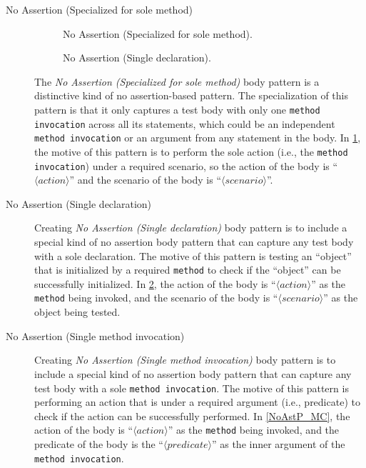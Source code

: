 \documentclass[proposal.tex]{subfiles}
\begin{document}
\begin{description}
\item[No Assertion (Specialized for sole method)]

\begin{figure}[t]
\centering
    \begin{subfigure}{0.6\textwidth}
    \end{subfigure}
\caption{No Assertion (Specialized for sole method).}
\label{NoAstP_one}
\end{figure}

\begin{figure}[t]
\centering
    \begin{subfigure}{0.7\textwidth}
    \end{subfigure}
\caption{No Assertion (Single declaration).}
\label{NoAstP_SD}
\end{figure}


The \textit{No Assertion (Specialized for sole method)} body pattern is a distinctive kind of no assertion-based pattern.
%
The specialization of this pattern is that it only captures a test body with only one \texttt{method invocation} across all its statements, which could be an independent \texttt{method invocation} or an argument from any statement in the body.
%
In \cref{NoAstP_one}, the motive of this pattern is to perform the sole action (i.e., the \texttt{method invocation}) under a required scenario, so the action of the body is \enquote{$\langle action \rangle$} and the scenario of the body is \enquote{$\langle scenario \rangle$}.


\item[No Assertion (Single declaration)]


Creating \textit{No Assertion (Single declaration)} body pattern is to include a special kind of no assertion body pattern that can capture any test body with a sole declaration.
%
The motive of this pattern is testing an \enquote{object} that is initialized by a required \texttt{method} to check if the \enquote{object} can be successfully initialized.
%
In \cref{NoAstP_SD}, the action of the body is \enquote{$\langle action \rangle$} as the \texttt{method} being invoked, and the scenario of the body is \enquote{$\langle scenario \rangle$} as the object being tested.


\item[No Assertion (Single method invocation)]


Creating \textit{No Assertion (Single method invocation)} body pattern is to include a special kind of no assertion body pattern that can capture any test body with a sole \texttt{method invocation}.
%
The motive of this pattern is performing an action that is under a required argument (i.e., predicate) to check if the action can be successfully performed.
%
In \cref{NoAstP_MC}, the action of the body is \enquote{$\langle action \rangle$} as the \texttt{method} being invoked, and the predicate of the body is the \enquote{$\langle predicate \rangle$} as the inner argument of the \texttt{method invocation}.



\end{description}
\end{document}
